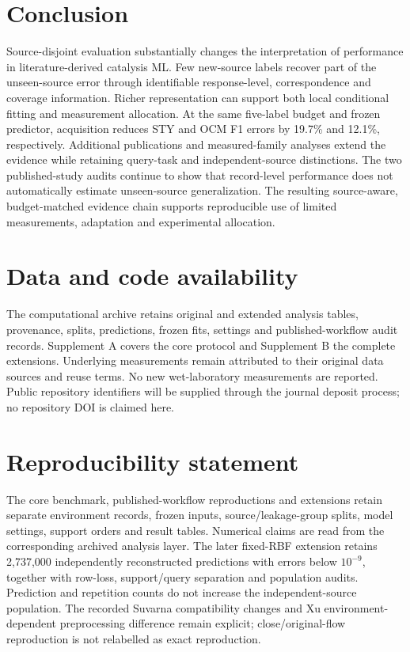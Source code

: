 \documentclass[11pt,a4paper]{article}
\begin{document}
\section{Conclusion}
Source-disjoint evaluation substantially changes the interpretation of performance in literature-derived catalysis ML.
Few new-source labels recover part of the unseen-source error through identifiable response-level, correspondence and coverage information.
Richer representation can support both local conditional fitting and measurement allocation.
At the same five-label budget and frozen predictor, acquisition reduces STY and OCM F1 errors by 19.7\% and 12.1\%, respectively.
Additional publications and measured-family analyses extend the evidence while retaining query-task and independent-source distinctions.
The two published-study audits continue to show that record-level performance does not automatically estimate unseen-source generalization.
The resulting source-aware, budget-matched evidence chain supports reproducible use of limited measurements, adaptation and experimental allocation.

\section*{Data and code availability}
The computational archive retains original and extended analysis tables, provenance, splits, predictions, frozen fits, settings and published-workflow audit records. Supplement A covers the core protocol and Supplement B the complete extensions. Underlying measurements remain attributed to their original data sources and reuse terms. No new wet-laboratory measurements are reported. Public repository identifiers will be supplied through the journal deposit process; no repository DOI is claimed here.

\section*{Reproducibility statement}
The core benchmark, published-workflow reproductions and extensions retain separate environment records, frozen inputs, source/leakage-group splits, model settings, support orders and result tables.
Numerical claims are read from the corresponding archived analysis layer.
The later fixed-RBF extension retains 2,737,000 independently reconstructed predictions with errors below $10^{-9}$, together with row-loss, support/query separation and population audits.
Prediction and repetition counts do not increase the independent-source population.
The recorded Suvarna compatibility changes and Xu environment-dependent preprocessing difference remain explicit; close/original-flow reproduction is not relabelled as exact reproduction.


\end{document}
